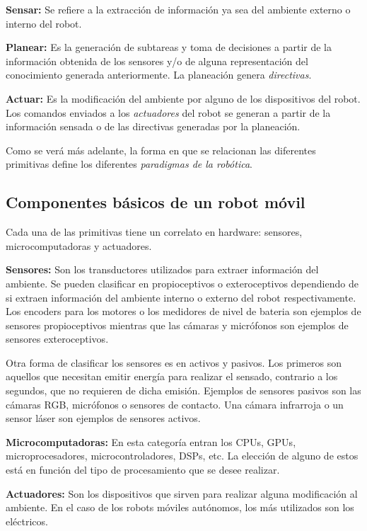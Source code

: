 \documentclass[letterpaper,12pt]{article}
\begin{document}
\textbf{Sensar:} Se refiere a la extracción de información ya sea del ambiente externo o interno del robot. 

\textbf{Planear:} Es la generación de subtareas y toma de decisiones a partir de la información obtenida de los sensores y/o de alguna representación del conocimiento generada anteriormente. La planeación genera \textit{directivas}.

\textbf{Actuar:} Es la modificación del ambiente por alguno de los dispositivos del robot. Los comandos enviados a los \textit{actuadores} del robot se generan a partir de la información sensada o de las directivas generadas por la planeación. 

Como se verá más adelante, la forma en que se relacionan las diferentes primitivas define los diferentes \textit{paradigmas de la robótica}.

\subsection{Componentes básicos de un robot móvil}
Cada una de las primitivas tiene un correlato en hardware: sensores, microcomputadoras y actuadores. 

\textbf{Sensores:} Son los transductores utilizados para extraer información del ambiente. Se pueden clasificar en propioceptivos o exteroceptivos dependiendo de si extraen información del ambiente interno o externo del robot respectivamente. Los encoders para los motores o los medidores de nivel de bateria son ejemplos de sensores propioceptivos mientras que las cámaras y micrófonos son ejemplos de sensores exteroceptivos. 

Otra forma de clasificar los sensores es en activos y pasivos. Los primeros son aquellos que necesitan emitir energía para realizar el sensado, contrario a los segundos, que no requieren de dicha emisión. Ejemplos de sensores pasivos son las cámaras RGB, micrófonos o sensores de contacto. Una cámara infrarroja o un sensor láser son ejemplos de sensores activos. 

\textbf{Microcomputadoras:} En esta categoría entran los CPUs, GPUs, microprocesadores, microcontroladores, DSPs, etc. La elección de alguno de estos está en función del tipo de procesamiento que se desee realizar.

\textbf{Actuadores:} Son los dispositivos que sirven para realizar alguna modificación al ambiente. En el caso de los robots móviles autónomos, los más utilizados son los eléctricos. 
\end{document}
